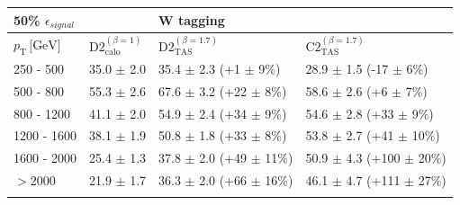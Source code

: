 \begin{table}[]
\centering
\begin{tabular}{llll}
 \multicolumn{1}{l||}{\textbf{50\% $\epsilon_{signal}$}} &                                                & \textbf{W tagging}                                         &                                          \\ \hline
\multicolumn{1}{l||}{$p_{\mathrm{T}} \, \text{[GeV]}$}           & \multicolumn{1}{l|}{$\text{D2}_{\text{calo}}^{(\beta=1)}$} & \multicolumn{1}{l|}{$\text{D2}_{\text{TAS}}^{(\beta=1.7)}$} & \multicolumn{1}{l|}{$\text{C2}_{\text{TAS}}^{(\beta=1.7)}$} \\ \hline \hline
\multicolumn{1}{l||}{250 - 500}                       & \multicolumn{1}{l|}{35.0 $\pm$ 2.0}                      & \multicolumn{1}{l|}{35.4 $\pm$ 2.3 (+1 $\pm$ 9\%)}         & \multicolumn{1}{l|}{28.9 $\pm$ 1.5 (-17 $\pm$ 6\%)}        \\
\multicolumn{1}{l||}{500 - 800}                       & \multicolumn{1}{l|}{55.3 $\pm$ 2.6}                      & \multicolumn{1}{l|}{67.6 $\pm$ 3.2 (+22 $\pm$ 8\%)}        & \multicolumn{1}{l|}{58.6 $\pm$ 2.6 (+6 $\pm$ 7\%)}         \\
\multicolumn{1}{l||}{800 - 1200}                      & \multicolumn{1}{l|}{41.1 $\pm$ 2.0}                      & \multicolumn{1}{l|}{54.9 $\pm$ 2.4 (+34 $\pm$ 9\%)}        & \multicolumn{1}{l|}{54.6 $\pm$ 2.8 (+33 $\pm$ 9\%)}        \\
\multicolumn{1}{l||}{1200 - 1600}                     & \multicolumn{1}{l|}{38.1 $\pm$ 1.9}                      & \multicolumn{1}{l|}{50.8 $\pm$ 1.8 (+33 $\pm$ 8\%)}        & \multicolumn{1}{l|}{53.8 $\pm$ 2.7 (+41 $\pm$ 10\%)}        \\
\multicolumn{1}{l||}{1600 - 2000}                     & \multicolumn{1}{l|}{25.4 $\pm$ 1.3}                      & \multicolumn{1}{l|}{37.8 $\pm$ 2.0 (+49 $\pm$ 11\%)}       & \multicolumn{1}{l|}{50.9 $\pm$ 4.3 (+100 $\pm$ 20\%)}       \\
\multicolumn{1}{l||}{$>2000$}                         & \multicolumn{1}{l|}{21.9 $\pm$ 1.7}                      & \multicolumn{1}{l|}{36.3 $\pm$ 2.0 (+66 $\pm$ 16\%)}       & \multicolumn{1}{l|}{46.1 $\pm$ 4.7 (+111 $\pm$ 27\%)}       \\ \hline
                                                     &                                                &                                          &                                          \\

\end{tabular}
\end{table}
